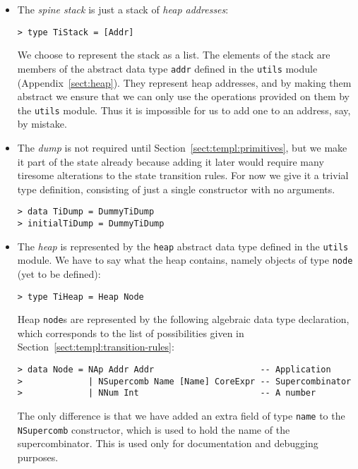 \begin{itemize}
\item
The {\em spine stack\/}
is just a stack of {\em heap addresses\/}:
\begin{verbatim}
> type TiStack = [Addr]
\end{verbatim}
%
We choose to represent the stack as a list.  The elements of the stack
are members of the abstract data type \mbox{\tt addr} defined in the \mbox{\tt utils}
module (Appendix~\ref{sect:heap}).
They represent heap addresses, and by making them abstract we ensure that
we can only use the operations provided on them by the \mbox{\tt utils} module.
Thus it is impossible for us to add one to an address, say, by mistake.

\item
The {\em dump\/} is
not required until Section~\ref{sect:templ:primitives}, but we make it
part of the state already because adding it later would require many tiresome
alterations to the state transition rules.  For now we give it a trivial
type definition, consisting of just a single constructor with no arguments.
\begin{verbatim}
> data TiDump = DummyTiDump
> initialTiDump = DummyTiDump
\end{verbatim}
%
%
\item
The {\em heap\/} is represented by the \mbox{\tt heap} abstract data type defined in
the \mbox{\tt utils} module.  We have to say what the heap contains, namely objects
of type \mbox{\tt node} (yet to be defined):
\begin{verbatim}
> type TiHeap = Heap Node
\end{verbatim}
%
Heap \mbox{\tt node}s are represented by the following algebraic data type
declaration, which corresponds to the list of possibilities given in
Section~\ref{sect:templ:transition-rules}:
\begin{verbatim}
> data Node = NAp Addr Addr                     -- Application
>             | NSupercomb Name [Name] CoreExpr -- Supercombinator
>             | NNum Int                        -- A number
\end{verbatim}
%
%
%
The only difference is that we have added an extra field of type
\mbox{\tt name} to the \mbox{\tt NSupercomb} constructor, which is used to hold the name
of the supercombinator.  This is used only for documentation and
debugging purposes.


\end{itemize}
